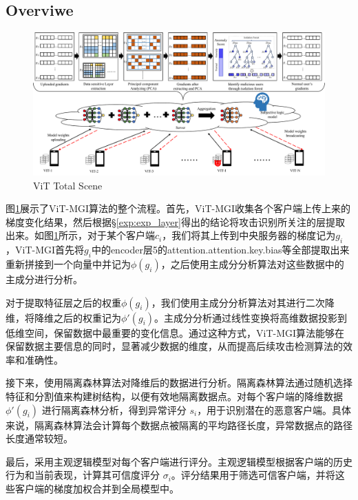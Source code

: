 \documentclass[conference]{IEEEtran}
\def\figTotalScene{\textwidth}
\begin{document}
\subsection{Overviwe}
\label{sec:method_basic}

\begin{figure}[htbp]
    \centerline{\includegraphics[width=\figTotalScene]{pics/000-totalScene.pdf}}
    \caption{ViT Total Scene}
    \label{fig:totalScene}
\end{figure}

图\hyperref[fig:totalScene]{\ref{fig:totalScene}}展示了ViT-MGI算法的整个流程。首先，ViT-MGI收集各个客户端上传上来的梯度变化结果，然后根据\hyperref[exp:exp_layer]{§\ref{exp:exp_layer}}得出的结论将攻击识别所关注的层提取出来。如图\hyperref[fig:totalScene]{\ref{fig:totalScene}}所示，对于某个客户端$c_i$，我们将其上传到中央服务器的梯度记为$g_i$，ViT-MGI首先将$g_i$中的encoder层5的attention.attention.key.bias等全部提取出来重新拼接到一个向量中并记为$\phi(g_i)$，之后使用主成分分析算法对这些数据中的主成分进行分析。

对于提取特征层之后的权重$\phi(g_i)$，我们使用主成分分析算法对其进行二次降维，将降维之后的权重记为$\phi'(g_i)$。主成分分析通过线性变换将高维数据投影到低维空间，保留数据中最重要的变化信息。通过这种方式，ViT-MGI算法能够在保留数据主要信息的同时，显著减少数据的维度，从而提高后续攻击检测算法的效率和准确性。

接下来，使用隔离森林算法对降维后的数据进行分析。隔离森林算法通过随机选择特征和分割值来构建树结构，以便有效地隔离数据点。对每个客户端的降维数据 $\phi'(g_i)$ 进行隔离森林分析，得到异常评分 $s_i$，用于识别潜在的恶意客户端。具体来说，隔离森林算法会计算每个数据点被隔离的平均路径长度，异常数据点的路径长度通常较短。

最后，采用主观逻辑模型对每个客户端进行评分。主观逻辑模型根据客户端的历史行为和当前表现，计算其可信度评分 $\sigma_i$。评分结果用于筛选可信客户端，并将这些客户端的梯度加权合并到全局模型中。
\end{document}

